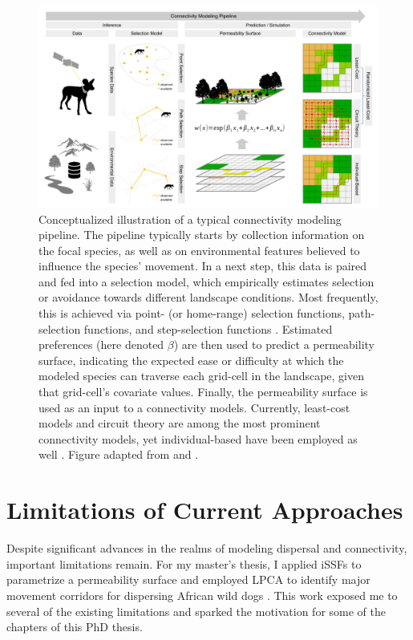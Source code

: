 \documentclass[../FinalThesis.tex]{subfiles}
\begin{document}
\begin{figure}[htpb]
\begin{center}
  \includegraphics[width = \textwidth]{Figures/ConnectivityModeling}
  \caption{Conceptualized illustration of a typical connectivity modeling
  pipeline. The pipeline typically starts by collection information on the focal
  species, as well as on environmental features believed to influence the
  species' movement. In a next step, this data is paired and fed into a
  selection model, which empirically estimates selection or avoidance towards
  different landscape conditions. Most frequently, this is achieved via point-
  (or home-range) selection functions, path-selection functions, and
  step-selection functions \citep{Zeller.2012}. Estimated preferences (here
  denoted $\beta$) are then used to predict a permeability surface, indicating
  the expected ease or difficulty at which the modeled species can traverse each
  grid-cell in the landscape, given that grid-cell's covariate values. Finally,
  the permeability surface is used as an input to a connectivity models.
  Currently, least-cost models and circuit theory are among the most prominent
  connectivity models, yet individual-based have been employed as well
  \citep{Diniz.2019}. Figure adapted from \citet{Zeller.2012} and
  \citet{Diniz.2019}.}
  \label{ConnectivityModeling}
\end{center}
\end{figure}

\section{Limitations of Current Approaches}

Despite significant advances in the realms of modeling dispersal and
connectivity, important limitations remain. For my master's thesis, I applied
iSSFs to parametrize a permeability surface and employed LPCA to identify major
movement corridors for dispersing African wild dogs \citep{Hofmann.2021}. This
work exposed me to several of the existing limitations and sparked the
motivation for some of the chapters of this PhD thesis.
\end{document}
